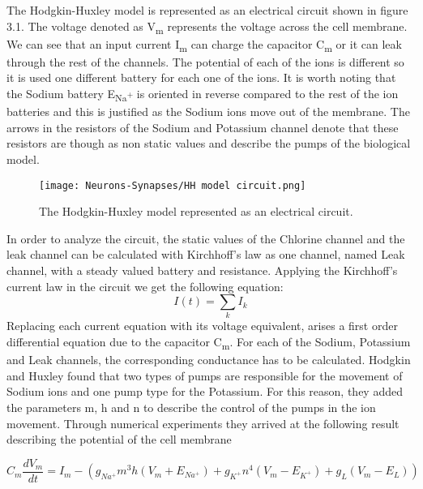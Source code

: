 \documentclass[12pt]{report}
\begin{document}
The Hodgkin-Huxley model is represented as an electrical circuit shown in figure 3.1. The voltage denoted as V\textsubscript{m} represents the voltage across the cell membrane. We can see that an input current I\textsubscript{m} can charge the capacitor C\textsubscript{m} or it can leak through the rest of the channels. The potential of each of the ions is different so it is used one different battery for each one of the ions. It is worth noting that the Sodium battery E\textsubscript{Na\textsuperscript{+}} is oriented in reverse compared to the rest of the ion batteries and this is justified as the Sodium ions move out of the membrane. The arrows in the resistors of the Sodium and Potassium channel denote that these resistors are though as non static values and describe the pumps of the biological model.

\begin{figure}[htp]
    \centering
    \texttt{[image: Neurons-Synapses/HH model circuit.png]}
    \caption{The Hodgkin-Huxley model represented as an electrical circuit.}
    \label{fig:neurons-multipolar}
\end{figure}

In order to analyze the circuit, the static values of the Chlorine channel and the leak channel can be calculated with Kirchhoff's law as one channel, named Leak channel, with a steady valued battery and resistance. Applying the Kirchhoff's current law in the circuit we get the following equation: \[I(t) = \sum_{k}I_k\]
Replacing each current equation with its voltage equivalent, arises a first order differential equation due to the capacitor C\textsubscript{m}. For each of the Sodium, Potassium and Leak channels, the corresponding conductance has to be calculated. Hodgkin and Huxley found that two types of pumps are responsible for the movement of Sodium ions and one pump type for the Potassium. For this reason, they added the parameters m, h and n to describe the control of the pumps in the ion movement. Through numerical experiments they arrived at the following result describing the potential of the cell membrane

\begin{equation}
C_m\frac{dV_m}{dt} = I_m - (g_{Na^+}m^3h(V_m+E_{Na^+}) + g_{K^+}n^4(V_m-E_{K^+}) + g_L(V_m-E_L))
\end{equation}
\end{document}
